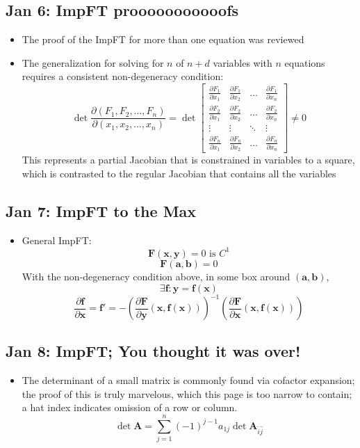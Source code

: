 \documentclass[10pt, oneside]{article}
\newcommand{\del}{\partial}
\renewcommand{\vec}[1]{\mathbf{#1}}
\newcommand{\vecf}[1]{\boldsymbol{#1}}
\newcommand{\mat}[1]{\mathbf{#1}}
\begin{document}
\subsection{Jan 6: ImpFT prooooooooooofs}
\begin{itemize}
    \item The proof of the ImpFT for more than one equation was reviewed
    \item The generalization for solving for $n$ of $n + d$ variables with $n$ equations requires a consistent non-degeneracy condition:
        \[\det \frac{\del(F_1,F_2,\hdots,F_n)}{\del(x_1,x_2,\hdots,x_n)} = \det 
        \begin{bmatrix}
            \frac{\del F_1}{\del x_1} & \frac{\del F_1}{\del x_2} & \dots  & \frac{\del F_1}{\del x_n} \\
            \frac{\del F_2}{\del x_1} & \frac{\del F_2}{\del x_2} & \dots  & \frac{\del F_2}{\del x_n} \\
            \vdots & \vdots & \ddots & \vdots \\
            \frac{\del F_n}{\del x_1} & \frac{\del F_n}{\del x_2} & \dots  & \frac{\del F_n}{\del x_n}
        \end{bmatrix} \neq 0\]
    This represents a partial Jacobian that is constrained in variables to a square, which is contrasted to the regular Jacobian that contains all the variables
\end{itemize}

\subsection{Jan 7: ImpFT to the Max}
\begin{itemize}
    \item General ImpFT:
            \[\vecf{F}(\vec{x},\vec{y}) = 0 \text{ is } C^1\]
            \[\vecf{F}(\vec{a},\vec{b}) = 0\]
            With the non-degeneracy condition above, in some box around $(\vec{a},\vec{b})$,
            \[\exists \vecf{f} : \vec{y} = \vecf{f}(\vec{x})\]
            \[\frac{\del \vecf{f}}{\del \vec{x}} = \vecf{f}' = -\left( \frac{\del \vecf{F}}{\del \vec{y}} (\vec{x},\vecf{f}(\vec{x}))\right)^{-1} \left( \frac{\del \vecf{F}}{\del \vec{x}} (\vec{x},\vecf{f}(\vec{x})) \right)\]
\end{itemize}
    
\subsection{Jan 8: ImpFT; You thought it was over!}
\begin{itemize}
    \item The determinant of a small matrix is commonly found via cofactor expansion; the proof of this is truly marvelous, which this page is too narrow to contain; a hat index indicates omission of a row or column.
        \[\det \mat{A} = \sum_{j = 1}^n (-1)^{j-1} a_{1j} \det \mat{A}_{\hat{i} \hat{j}}\]
\end{itemize}
\end{document}
